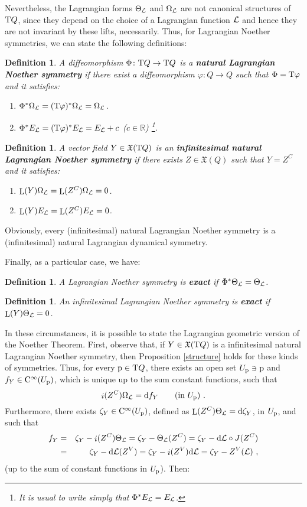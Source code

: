 \documentclass[12pt]{report}
\newtheorem{definition}[teor]{Definition}
\def\beq{\begin{equation}}
\def\eeq{\end{equation}}
\def\bea{\begin{eqnarray}}
\def\eea{\end{eqnarray}}
\def\ben{\begin{enumerate}}
\def\een{\end{enumerate}}
\def\vf{\mathfrak X}
\def\Lag{{\cal L}}
\def\d{{\rm d}}
\def\Real{\mathbb{R}}
\def\Tan{{\rm T}}
\def\Lie{\mathop{\rm L}\nolimits}
\def\inn{\mathop{i}\nolimits}
\def\Cinfty{{\rm C}^\infty}
\begin{document}
Nevertheless, the Lagrangian forms $\Theta_\Lag$ and $\Omega_\Lag$
are not canonical structures of $\Tan Q$,
since they depend on the choice of a Lagrangian function $\Lag$
and hence they are not  invariant by these lifts, necessarily.
Thus,  for Lagrangian Noether symmetries, we can state the following definitions:

\begin{definition}
A diffeomorphism $\Phi\colon\Tan Q\to \Tan Q$ is a
\textbf{natural Lagrangian Noether symmetry}
if there exist a diffeomorphism $\varphi\colon Q\to Q$ such that
$\Phi=\Tan\varphi$ and it satisfies:
\ben
\item
$\Phi^*\Omega_\Lag=(\Tan\varphi)^*\Omega_\Lag=\Omega_\Lag$.
\item
$\Phi^*E_\Lag=(\Tan\varphi)^*E_\Lag=E_\Lag+c$ ($c\in\Real$)
\footnote{
It is usual to write simply that $\Phi^*E_\Lag =E_\Lag$.
}.
\een
\label{nls}
\end{definition}

\begin{definition}
A vector field $Y\in\vf(\Tan Q)$ is an
\textbf{infinitesimal natural Lagrangian Noether symmetry}
if there exists $Z\in\vf (Q)$ such that $Y=Z^{C}$ and it satisfies:
\ben
\item
 $\Lie(Y)\Omega_\Lag=\Lie(Z^{C})\Omega_\Lag=0$.
\item
$\Lie(Y)E_\Lag=\Lie(Z^{C})E_\Lag=0$.
\een
\label{nlsinf}
\end{definition}

Obviously, every (infinitesimal) natural Lagrangian Noether symmetry
is a (infinitesimal) natural Lagrangian dynamical symmetry.

Finally, as a particular case, we have:

\begin{definition}
A  Lagrangian Noether symmetry is \textbf{exact} if $\Phi^*\Theta_\Lag=\Theta_\Lag$.
\label{eCls}
\end{definition}

\begin{definition}
An infinitesimal  Lagrangian Noether symmetry is \textbf{exact}
if $\Lie(Y)\Theta_\Lag=0$.
\label{eClsinf}
\end{definition}

In these circumstances, it is possible to state the Lagrangian geometric version 
of the Noether Theorem.
First, observe that, if $Y\in\vf(\Tan Q)$ is a
infinitesimal natural Lagrangian Noether symmetry, then
Proposition \ref{structure} holds for these kinds of symmetries.
Thus, for every ${\rm p}\in \Tan Q$, there exists an open set $U_{\rm p}\ni{\rm p}$ and
$f_Y\in\Cinfty(U_{\rm p})$, which is unique up to the sum constant functions, such that
\beq
\inn(Z^C)\Omega_\Lag=\d f_Y \qquad \mbox{\rm (in $U_{\rm p}$)} \ .
\label{fA}
\eeq
Furthermore, there exists $\zeta_Y\in\Cinfty(U_{\rm p})$, defined as
 $\Lie(Z^C)\Theta_\Lag=\d\zeta_Y$, in $U_{\rm p}$, and such that
\bea
f_Y&=&\zeta_Y-\inn(Z^C)\Theta_\Lag=\zeta_Y-\Theta_\Lag(Z^C)=\zeta_Y-\d\Lag\circ J(Z^C)
\nonumber \\ &=&
\zeta_Y-\d\Lag(Z^V)=\zeta_Y-\inn(Z^V)\d\Lag=\zeta_Y-Z^V(\Lag) \ ,
\label{CV}
\eea
(up to the sum of constant functions in $U_{\rm p}$). Then:
\end{document}
